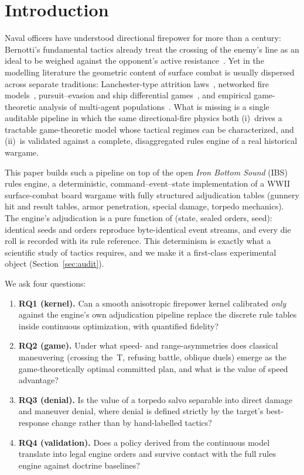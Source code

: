 \documentclass[12pt,a4paper]{article}
\begin{document}
\section{Introduction}\label{sec:intro}

Naval officers have understood directional firepower for more than a
century: Bernotti's fundamental tactics already treat the crossing of the
enemy's line as an ideal to be weighed against the opponent's active
resistance~\citep{bernotti1911}.  Yet in the modelling literature the
geometric content of surface combat is usually dispersed across separate
traditions: Lanchester-type attrition laws~\citep{taylor1974,
protopopescu1989,gonzalez2011}, networked fire models~\citep{networked2020},
pursuit--evasion and ship differential games~\citep{solis2020,weintraub2020,
cubic1993}, and empirical game-theoretic analysis of multi-agent
populations~\citep{lanctot2017,wellman2024,omidshafiei2019}.  What is
missing is a single auditable pipeline in which the same directional-fire
physics both (i)~drives a tractable game-theoretic model whose tactical
regimes can be characterized, and (ii)~is validated against a complete,
disaggregated rules engine of a real historical wargame.

This paper builds such a pipeline on top of the open \emph{Iron Bottom
Sound} (IBS) rules engine, a deterministic, command--event--state
implementation of a WWII surface-combat board wargame with fully
structured adjudication tables (gunnery hit and result tables, armor
penetration, special damage, torpedo mechanics).  The engine's adjudication
is a pure function of (state, sealed orders, seed): identical seeds and
orders reproduce byte-identical event streams, and every die roll is
recorded with its rule reference.  This determinism is exactly what a
scientific study of tactics requires, and we make it a first-class
experimental object (Section~\ref{sec:audit}).

We ask four questions:
\begin{enumerate}
\item \textbf{RQ1 (kernel).}  Can a smooth anisotropic firepower kernel
calibrated \emph{only} against the engine's own adjudication pipeline
replace the discrete rule tables inside continuous optimization, with
quantified fidelity?
\item \textbf{RQ2 (game).}  Under what speed- and range-asymmetries does
classical maneuvering (crossing the~T, refusing battle, oblique duels)
emerge as the game-theoretically optimal committed plan, and what is the
value of speed advantage?
\item \textbf{RQ3 (denial).}  Is the value of a torpedo salvo separable
into direct damage and maneuver denial, where denial is defined strictly
by the target's best-response change rather than by hand-labelled tactics?
\item \textbf{RQ4 (validation).}  Does a policy derived from the
continuous model translate into legal engine orders and survive contact
with the full rules engine against doctrine baselines?
\end{enumerate}
\end{document}
